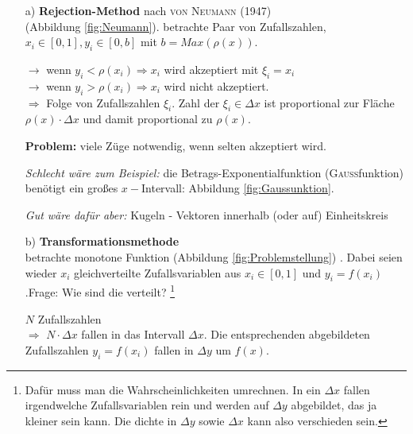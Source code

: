 \documentclass[12pt]{article}
\begin{document}
 \begin{itemize}
 \item[a)] \textbf{Rejection-Method} nach \textsc{von Neumann} (1947) \\ (Abbildung \ref{fig:Neumann}).
 betrachte Paar von Zufallszahlen, $x_i \in [0,1], y_i \in [0,b]$ mit $b=Max(\rho(x))$.
 
$\to$ wenn $y_i < \rho(x_i) \Rightarrow x_i$ wird akzeptiert mit $\xi_i=x_i$\\
 $\to$ wenn $y_i > \rho(x_i) \Rightarrow x_i$ wird nicht akzeptiert. \\
 
 $\Rightarrow$ Folge von Zufallszahlen $\xi_i$. Zahl der $\xi_i \in \Delta x$ ist proportional zur Fläche $\rho(x) \cdot \Delta x$ und damit proportional zu $\rho(x)$.
 
 \textbf{Problem:} viele Züge notwendig, wenn selten akzeptiert wird. 
 
 \textit{Schlecht wäre zum Beispiel:} die Betrags-Exponentialfunktion (\textsc{Gauß}funktion) benötigt ein großes $x-$Intervall: Abbildung \ref{fig:Gaussunktion}.
 
\textit{Gut wäre dafür aber:} Kugeln - 
Vektoren innerhalb (oder auf) Einheitskreis



\item[b)] \textbf{Transformationsmethode} \\
betrachte monotone Funktion (Abbildung \ref{fig:Problemstellung}) . Dabei seien wieder $x_i$ gleichverteilte Zufallsvariablen aus $x_i \in [0,1]$ und $y_i = f(x_i)$.Frage: Wie sind die verteilt? \footnote{Dafür muss man die Wahrscheinlichkeiten umrechnen. In ein $\Delta x$ fallen irgendwelche Zufallsvariablen rein und werden auf $\Delta y$ abgebildet, das ja kleiner sein kann. Die dichte in $\Delta y$ sowie $\Delta x$ kann also verschieden sein.} %

$N$ Zufallszahlen \\
 $\Rightarrow$ $N \cdot \Delta x$ fallen in das Intervall $\Delta x$. Die entsprechenden abgebildeten Zufallszahlen $y_i=f(x_i)$ fallen in $\Delta y$ um $f(x)$.


\end{itemize}
\end{document}
